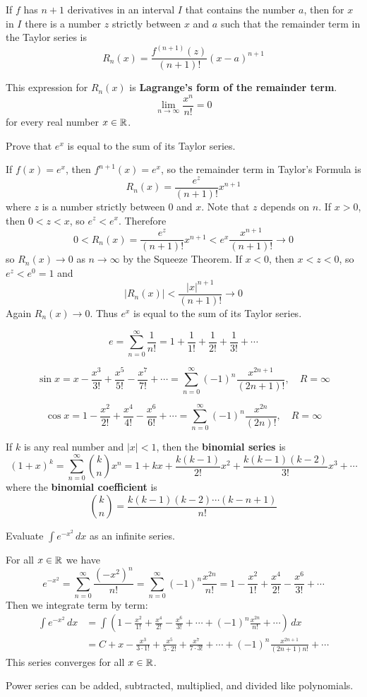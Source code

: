 \begin{theorem}
    If \(f\) has \(n+1\) derivatives in an interval \(I\) that contains the
    number \(a\), then for \(x\) in \(I\) there is a number \(z\) strictly
    between \(x\) and \(a\) such that the remainder term in the Taylor series
    is
    \[R_n(x)=\frac{f^{(n+1)}(z)}{(n+1)!}(x-a)^{n+1}\]
\end{theorem}
This expression for \(R_n(x)\) is
\textbf{Lagrange's form of the remainder term}.
\[\lim_{n\to\infty}\frac{x^n}{n!}=0\] for every real number \(x\in\mathbb{R}\).
\begin{problem}
    Prove that \(e^x\) is equal to the sum of its Taylor series.
\end{problem}
\begin{solution}
    If \(f(x)=e^x\), then \(f^{n+1}(x)=e^x\), so the remainder term in
    Taylor's Formula is
    \[R_n(x)=\frac{e^z}{(n+1)!}x^{n+1}\]
    where \(z\) is a number strictly between \(0\) and \(x\).
    Note that \(z\) depends on \(n\).
    If \(x>0\), then \(0<z<x\), so \(e^z<e^x\).
    Therefore
    \[0<R_n(x)=\frac{e^z}{(n+1)!}x^{n+1}<e^x\frac{x^{n+1}}{(n+1)!}\to 0\]
    so \(R_n(x)\to 0\) as \(n\to\infty\) by the Squeeze Theorem.
    If \(x<0\), then \(x<z<0\), so \(e^z<e^0=1\) and
    \[|R_n(x)|<\frac{|x|^{n+1}}{(n+1)!}\to 0\]
    Again \(R_n(x)\to 0\).
    Thus \(e^x\) is equal to the sum of its Taylor series.
\end{solution}
\[e=\sum_{n=0}^\infty\frac{1}{n!}=1+\frac{1}{1!}+\frac{1}{2!}+\frac{1}{3!}+\cdots\]

\[\sin x=x-\frac{x^3}{3!}+\frac{x^5}{5!}-\frac{x^7}{7!}+\cdots
=\sum_{n=0}^\infty(-1)^n\frac{x^{2n+1}}{(2n+1)!},\quad R=\infty\]

\[\cos x=1-\frac{x^2}{2!}+\frac{x^4}{4!}-\frac{x^6}{6!}+\cdots
=\sum_{n=0}^\infty(-1)^n\frac{x^{2n}}{(2n)!},\quad R=\infty\]

If \(k\) is any real number and \(|x|<1\), then the \textbf{binomial series}
is
\[(1+x)^k=\sum_{n=0}^\infty\binom{k}{n}x^n=1+kx+\frac{k(k-1)}{2!}x^2
+\frac{k(k-1)(k-2)}{3!}x^3+\cdots\]
where the \textbf{binomial coefficient} is
\[\binom{k}{n}=\frac{k(k-1)(k-2)\cdots(k-n+1)}{n!}\]
\begin{problem}
    Evaluate \(\displaystyle{\int e^{-x^2}}\,dx\) as an infinite series.
\end{problem}
\begin{solution}
    For all \(x\in\mathbb{R}\) we have
    \[e^{-x^2}=\sum_{n=0}^\infty\frac{(-x^2)^n}{n!}
    =\sum_{n=0}^\infty(-1)^n\frac{x^{2n}}{n!}
    =1-\frac{x^2}{1!}+\frac{x^4}{2!}-\frac{x^6}{3!}+\cdots\]
    Then we integrate term by term:
    \begin{align*}
        \int e^{-x^2}\,dx &= \int \left(1-\frac{x^2}{1!}+\frac{x^4}{2!}
        -\frac{x^6}{3!}+\cdots+(-1)^n\frac{x^{2n}}{n!}+\cdots\right)\,dx \\
        &= C+x-\frac{x^3}{3\cdot 1!}+\frac{x^5}{5\cdot 2!}
        +\frac{x^7}{7\cdot 3!}+\cdots+(-1)^n\frac{x^{2n+1}}{(2n+1)n!}+\cdots
    \end{align*}
    This series converges for all \(x\in\mathbb{R}\).
\end{solution}
Power series can be added, subtracted, multiplied, and divided like
polynomials.

